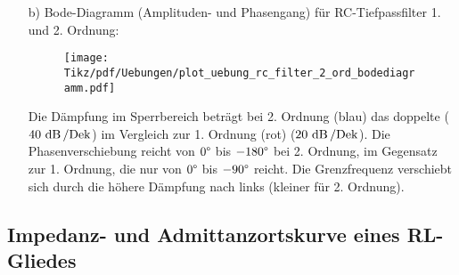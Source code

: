 {\begin{itemize}
\begin{align*}
            &= \frac{1}{1 - \Omega^2 + \mathrm{j}3\Omega} = \frac{1}{1 - (\omega C R)^2 + \mathrm{j}3\omega C R}
    \end{align*}
    Vergleich einfacher Tiefpass:
    \begin{align*}
        \underline{F}(\mathrm{j}\omega) = \frac{\frac{1}{\mathrm{j}\omega C}}{R + \frac{1}{\mathrm{j}\omega C}} = \frac{1}{1 + \mathrm{j}\omega C R} = \frac{1}{1 + \mathrm{j}\Omega}
    \end{align*}
    Wegen Kopplungseffekten kann der Frequenzgang des einfachen Tiefpasses bei Serienschaltung 
    nicht einfach multipliziert werden.

    \item[b)] Bode-Diagramm (Amplituden- und Phasengang) für RC-Tiefpassfilter 1. und 2. Ordnung:
    \begin{figure}[H]\centering
        \texttt{[image: Tikz/pdf/Uebungen/plot\_uebung\_rc\_filter\_2\_ord\_bodediagramm.pdf]}%
    \end{figure}
    Die Dämpfung im Sperrbereich beträgt bei 2. Ordnung (blau) das doppelte ($40\,\operatorname{dB}/\mathrm{Dek}$) 
    im Vergleich zur 1. Ordnung (rot) ($20\,\operatorname{dB}/\mathrm{Dek}$). 
    Die Phasenverschiebung reicht von $0\degree$ bis $-180\degree$ bei 2. Ordnung, 
    im Gegensatz zur 1. Ordnung, die nur von $0\degree$ bis $-90\degree$ reicht.
    Die Grenzfrequenz verschiebt sich durch die höhere Dämpfung nach links (kleiner für 2. Ordnung).
\end{itemize}
}


\subsection{Impedanz- und Admittanzortskurve eines RL-Gliedes\label{ueb:ortskurve:rl}}


